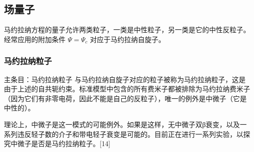 \subsection{场量子}  
马约拉纳方程的量子允许两类粒子，一类是中性粒子，另一类是它的中性反粒子。经常应用的附加条件 \( \Psi = \Psi_c \) 对应于马约拉纳自旋子。
\subsubsection{马约拉纳粒子}  
主条目：马约拉纳粒子  
与马约拉纳自旋子对应的粒子被称为马约拉纳粒子，这是由于上述的自共轭约束。标准模型中包含的所有费米子都被排除为马约拉纳费米子（因为它们有非零电荷，因此不能是自己的反粒子），唯一的例外是中微子（它是中性的）。

理论上，中微子是这一模式的可能例外。如果是这样，无中微子双β衰变，以及一系列违反轻子数的介子和带电轻子衰变是可能的。目前正在进行一系列实验，以探究中微子是否是马约拉纳粒子。[14]